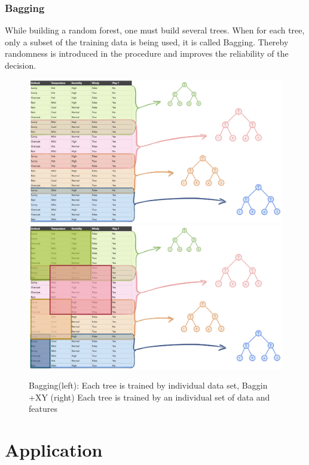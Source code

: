 \documentclass[
12pt,
headsepline,
bibliography=totoc,
twoside=semi,
fleqn
]{scrartcl}
\begin{document}
 \subsubsection{Bagging\label{sec:sec2-2-1}}
 While building a random forest, one must build several trees. When for each tree, only a subset of the training data is being used, it is called Bagging. Thereby randomness is introduced in the procedure and improves the reliability of the decision. 
 
 \begin{figure}[H]
 \includegraphics[scale=0.4]{BDT12.png}\label{fig:fig12}
 \includegraphics[scale=0.4]{BDT13.png}\label{fig:fig13}
 \caption{Bagging(left): Each tree is trained by individual data set, Baggin +XY (right) Each tree is trained by an individual set of data and features}
 
 \end{figure}


\section{Application\label{sec:sec3}}
\end{document}
